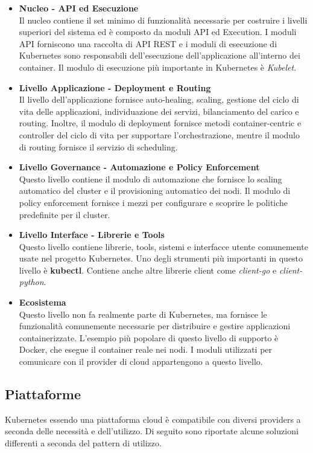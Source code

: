\documentclass[12pt, a4paper]{report}
\begin{document}
\begin{itemize}
  \item \textbf{Nucleo - API ed Esecuzione}\\
  Il nucleo contiene il set minimo di funzionalità necessarie per costruire i livelli superiori del sistema ed è composto da moduli API ed Execution. I moduli API forniscono una raccolta di API REST e i moduli di esecuzione di Kubernetes sono responsabili dell'esecuzione dell'applicazione all'interno dei container. Il modulo di esecuzione più importante in Kubernetes è \textit{Kubelet}.
  \item \textbf{Livello Applicazione - Deployment e Routing}\\
  Il livello dell'applicazione fornisce auto-healing, scaling, gestione del ciclo di vita delle applicazioni, individuazione dei servizi, bilanciamento del carico e routing. Inoltre, il modulo di deployment fornisce metodi container-centric e controller del ciclo di vita per supportare l'orchestrazione, mentre il modulo di routing fornisce il servizio di scheduling.
  \item \textbf{Livello Governance - Automazione e Policy Enforcement}\\
  Questo livello contiene il modulo di automazione che fornisce lo scaling automatico del cluster e il provisioning automatico dei nodi. Il modulo di policy enforcement fornisce i mezzi per configurare e scoprire le politiche predefinite per il cluster.
  \item \textbf{Livello Interface - Librerie e Tools}\\
  Questo livello contiene librerie, tools, sistemi e interfacce utente comunemente usate nel progetto Kubernetes. Uno degli strumenti più importanti in questo livello è \textbf{kubectl}. Contiene anche altre librerie client come \textit{client-go} e \textit{client-python}.
  \item \textbf{Ecosistema}\\
  Questo livello non fa realmente parte di Kubernetes, ma fornisce le funzionalità comunemente necessarie per distribuire e gestire applicazioni containerizzate. L'esempio più popolare di questo livello di supporto è Docker, che esegue il container reale nei nodi. I moduli utilizzati per comunicare con il provider di cloud appartengono a questo livello.
\end{itemize}
\newpage
\subsection{Piattaforme}
Kubernetes essendo una piattaforma cloud è compatibile con diversi providers a seconda delle necessità e dell'utilizzo. Di seguito sono riportate alcune soluzioni differenti a seconda del pattern di utilizzo.
\end{document}
